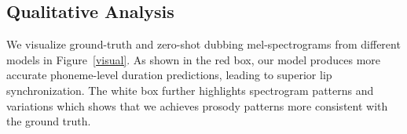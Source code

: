 \subsection{Qualitative Analysis}
We visualize ground-truth and zero-shot dubbing mel-spectrograms from different models in Figure~\ref{visual}. 
As shown in the red box, our model produces more accurate phoneme-level duration predictions, leading to superior lip synchronization. 
The white box further highlights spectrogram patterns and variations which shows that we achieves prosody patterns more consistent with the ground truth.



% 